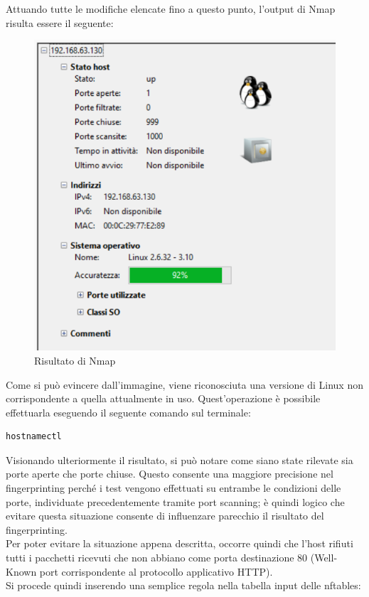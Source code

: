 Attuando tutte le modifiche elencate fino a questo punto, l'output di Nmap risulta essere il seguente:

\begin{figure}[H]
	\centering
	\includegraphics[scale=0.85]{figures/primo_nmap.png}
	\caption{Risultato di Nmap}
	\label{primo_nmap}
\end{figure}

Come si può evincere dall'immagine, viene riconosciuta una versione di Linux non corrispondente a quella attualmente in uso. Quest'operazione è possibile effettuarla eseguendo il seguente comando sul terminale:
\begin{lstlisting}[caption={Comando per mostrare la versione attualmente in uso}]
	hostnamectl
\end{lstlisting}
Visionando ulteriormente il risultato, si può notare come siano state rilevate sia porte aperte che porte chiuse. Questo consente una maggiore precisione nel fingerprinting perché i test vengono effettuati su entrambe le condizioni delle porte, individuate precedentemente tramite port scanning; è quindi logico che evitare questa situazione consente di influenzare parecchio il risultato del fingerprinting.
\\
Per poter evitare la situazione appena descritta, occorre quindi che l'host rifiuti tutti i pacchetti ricevuti che non abbiano come porta destinazione 80 (Well-Known port corrispondente al protocollo applicativo HTTP).
\\
Si procede quindi inserendo una semplice regola nella tabella input delle nftables:

